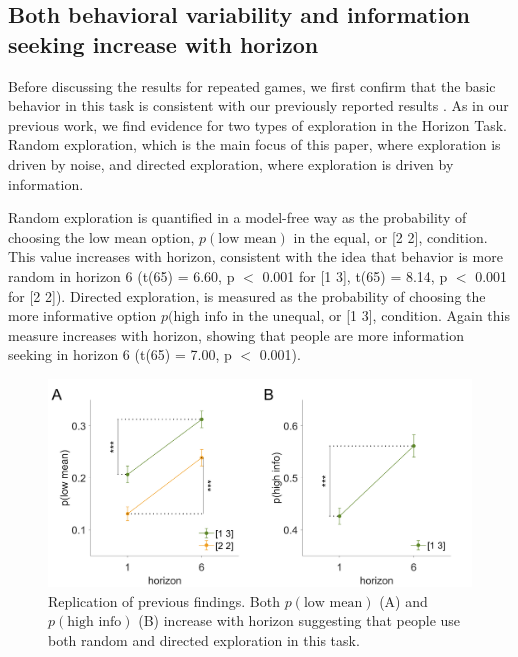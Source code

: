 \documentclass[12pt]{article}
\begin{document}
	
	

	\subsection*{Both behavioral variability and information seeking increase with horizon}
	
	Before discussing the results for repeated games, we first confirm that the basic behavior in this task is consistent with our previously reported results \citep{wilson2014}. As in our previous work, we find evidence for two types of exploration in the Horizon Task.  Random exploration, which is the main focus of this paper, where exploration is driven by noise, and directed exploration, where exploration is driven by information. 
	
	Random exploration is quantified in a model-free way as the probability of choosing the low mean option, $p(\mbox{low mean})$ in the equal, or [2 2], condition. This value increases with horizon, consistent with the idea that behavior is more random in horizon 6 (t(65) = 6.60, p $<$ 0.001 for [1 3], t(65) = 8.14, p $<$ 0.001 for [2 2]).  Directed exploration, is measured as the probability of choosing the more informative option $p(\mbox{high info}$ in the unequal, or [1 3], condition. Again this measure increases with horizon, showing that people are more information seeking in horizon 6 (t(65) = 7.00, p $<$ 0.001).
	
	\begin{figure}[H]
		\begin{center}
			\includegraphics[width=\textwidth]{figures/line_modelfree.png}
			\caption{
			Replication of previous findings. Both  $p(\mbox{low mean})$ (A) and $p(\mbox{high info})$ (B) increase with horizon suggesting that people use both random and directed exploration in this task.  }
			\label{fig:modelfree}
		\end{center}
	\end{figure}
	
\end{document}

